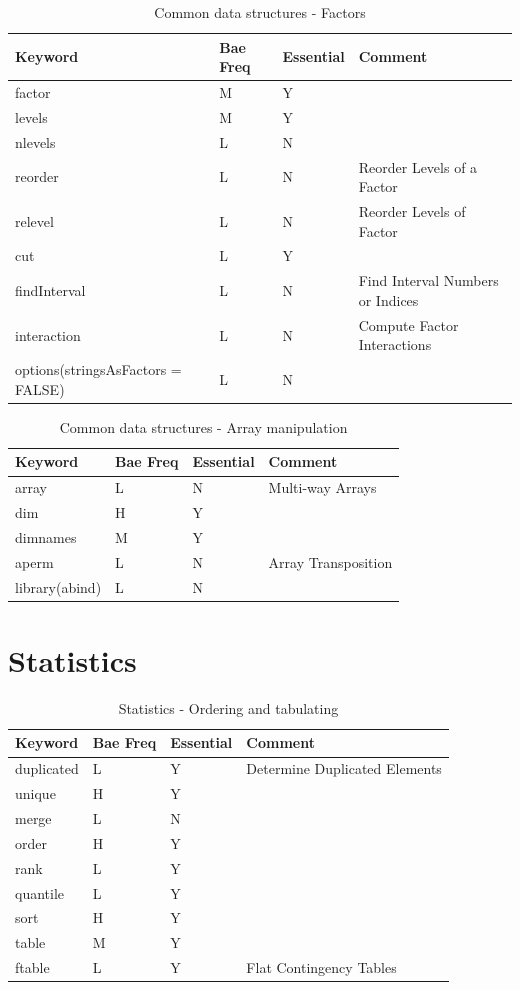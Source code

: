 \documentclass[10pt,]{krantz}
\theoremstyle{definition}
\theoremstyle{definition}
\theoremstyle{remark}
\begin{document}
\begin{table}

\caption{\label{tab:knitchunk14}Common data structures - Factors }
\centering
\begin{tabular}[t]{llll}
\toprule
Keyword & Bae Freq & Essential & Comment\\
\midrule
factor & M & Y & \\
levels & M & Y & \\
nlevels & L & N & \\
reorder & L & N & Reorder Levels of a Factor\\
relevel & L & N & Reorder Levels of Factor\\
\addlinespace
cut & L & Y & \\
findInterval & L & N & Find Interval Numbers or Indices\\
interaction & L & N & Compute Factor Interactions\\
options(stringsAsFactors = FALSE) & L & N & \\
\bottomrule
\end{tabular}
\end{table}

\begin{table}

\caption{\label{tab:knitchunk15}Common data structures - Array manipulation}
\centering
\begin{tabular}[t]{llll}
\toprule
Keyword & Bae Freq & Essential & Comment\\
\midrule
array & L & N & Multi-way Arrays\\
dim & H & Y & \\
dimnames & M & Y & \\
aperm & L & N & Array Transposition\\
library(abind) & L & N & \\
\bottomrule
\end{tabular}
\end{table}

\section{Statistics}\label{statistics}

\begin{table}

\caption{\label{tab:knitchunk16}Statistics - Ordering and tabulating }
\centering
\begin{tabular}[t]{llll}
\toprule
Keyword & Bae Freq & Essential & Comment\\
\midrule
duplicated & L & Y & Determine Duplicated Elements\\
unique & H & Y & \\
merge & L & N & \\
order & H & Y & \\
rank & L & Y & \\
\addlinespace
quantile & L & Y & \\
sort & H & Y & \\
table & M & Y & \\
ftable & L & Y & Flat Contingency Tables\\
\bottomrule
\end{tabular}
\end{table}
\end{document}
